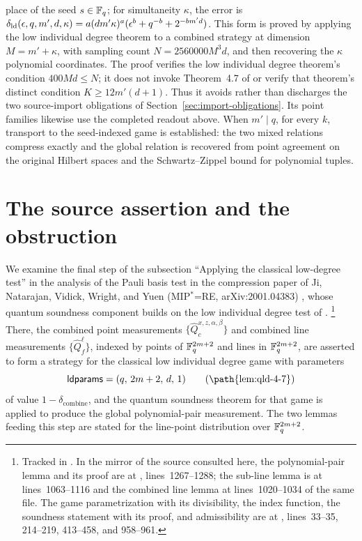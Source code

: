 \documentclass[11pt]{article}
\begin{document}
\begin{enumerate}
  place of the seed $s \in \mathbb{F}_q$; for simultaneity $\kappa$, the error is
  $\delta_{\mathrm{ld}}(\epsilon,q,m',d,\kappa)
  = a(dm'\kappa)^a(\epsilon^b + q^{-b} + 2^{-bm'd})$.  This form is proved by
  applying the low individual degree theorem to a combined strategy at
  dimension $M=m'+\kappa$, with sampling count $N=2560000M^3d$, and then
  recovering the $\kappa$ polynomial coordinates.  The proof verifies the low
  individual degree theorem's condition $400Md \le N$; it does not invoke
  Theorem~4.7 of \cite{Ji2021Quantum} or verify that theorem's distinct
  condition $K \ge 12m'(d+1)$.  Thus it avoids rather than discharges the
  two source-import obligations of Section~\ref{sec:import-obligations}.
  Its point families likewise use the completed readout above.
  When $m'\mid q$, for every $k$, transport to the seed-indexed game is
  established: the two mixed relations compress exactly and the global relation is recovered
  from point agreement on the original Hilbert spaces and the
  Schwartz--Zippel bound for polynomial tuples.
\end{enumerate}

\section{The source assertion and the obstruction}

We examine the final step of the subsection ``Applying the classical
low-degree test'' in the analysis of the Pauli basis test in the compression
paper of Ji, Natarajan, Vidick, Wright, and Yuen (MIP$^{*}$=RE,
arXiv:2001.04383) \cite{Ji2020MIPStar}, whose quantum soundness component builds on the low
individual degree test of \cite{Ji2020LowIndividualDegree}.%
\footnote{Tracked in .  In the mirror of the source
consulted here, the polynomial-pair lemma and its proof are at
,
lines~1267--1288; the sub-line lemma is at lines~1063--1116 and the combined
line lemma at lines~1020--1034 of the same file.  The game parametrization
with its divisibility, the index function, the soundness statement with its
proof, and admissibility are at
,
lines~33--35, 214--219, 413--458, and 958--961.}
There, the combined point measurements
$\{\hat Q^{x,z,\alpha,\beta}_c\}$ and combined line measurements
$\{\hat Q^{\ell}_f\}$, indexed by points of $\mathbb{F}_q^{2m+2}$ and lines in
$\mathbb{F}_q^{2m+2}$, are asserted to form a strategy for the classical low
individual degree game with parameters
\[
  \mathsf{ldparams} = (q,\, 2m+2,\, d,\, 1)
  \tag{\path{lem:qld-4-7}}
\]
of value $1 - \delta_{\mathrm{combine}}$, and the quantum soundness theorem
for that game is applied to produce the global polynomial-pair measurement.
The two lemmas feeding this step are stated for the line-point distribution
over $\mathbb{F}_q^{2m+2}$.
\end{document}
